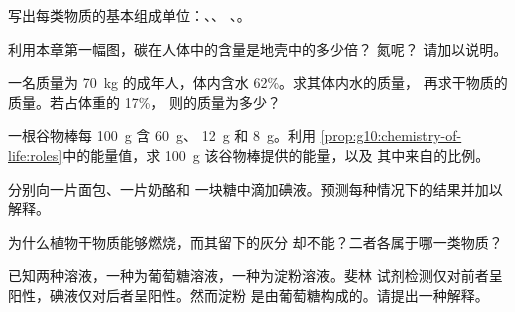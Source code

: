 \begin{exercise}[$\star$]\label{exo:g10:chemistry-of-life:5}
写出每类物质的基本组成单位：、、
、。
\end{exercise}

\begin{exercise}[$\star\star$]\label{exo:g10:chemistry-of-life:6}
利用本章第一幅图，碳在人体中的含量是地壳中的多少倍？
氮呢？
请加以说明。
\end{exercise}

\begin{exercise}[$\star\star$]\label{exo:g10:chemistry-of-life:7}
一名质量为 \qty{70}{kg} 的成年人，体内含水 62\%。求其体内水的质量，
再求干物质的质量。若占体重的 17\%，
则的质量为多少？
\end{exercise}

\begin{exercise}[$\star\star$]\label{exo:g10:chemistry-of-life:8}
一根谷物棒每 \qty{100}{g} 含 \qty{60}{g}、
 \qty{12}{g} 和 \qty{8}{g}。利用
\cref{prop:g10:chemistry-of-life:roles}中的能量值，求
\qty{100}{g} 该谷物棒提供的能量，以及
其中来自的比例。
\end{exercise}

\begin{exercise}[$\star\star$]\label{exo:g10:chemistry-of-life:9}
分别向一片面包、一片奶酪和
一块糖中滴加碘液。预测每种情况下的结果并加以解释。
\end{exercise}

\begin{exercise}[$\star\star$]\label{exo:g10:chemistry-of-life:10}
为什么植物干物质能够燃烧，而其留下的灰分
却不能？二者各属于哪一类物质？
\end{exercise}

\begin{exercise}[$\star\star$]\label{exo:g10:chemistry-of-life:11}
已知两种溶液，一种为葡萄糖溶液，一种为淀粉溶液。斐林
试剂检测仅对前者呈阳性，碘液仅对后者呈阳性。然而淀粉
是由葡萄糖构成的。请提出一种解释。
\end{exercise}

